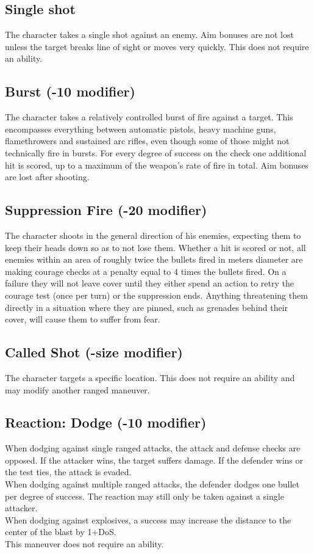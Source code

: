 \documentclass[12pt,a4paper,openany]{book}
\begin{document}
	\subsection*{Single shot}
	The character takes a single shot against an enemy. Aim bonuses are not lost unless the target breaks line of sight or moves very quickly. This does not require an ability.
	\subsection*{Burst (-10 modifier)}
	The character takes a relatively controlled burst of fire against a target. This encompasses everything between automatic pistols, heavy machine guns, flamethrowers and sustained arc rifles, even though some of those might not technically fire in bursts. For every degree of success on the check one additional hit is scored, up to a maximum of the weapon’s rate of fire in total. Aim bonuses are lost after shooting.
	\subsection*{Suppression Fire (-20 modifier)}
	The character shoots in the general direction of his enemies, expecting them to keep their heads down so as to not lose them. Whether a hit is scored or not, all enemies within an area of roughly twice the bullets fired in meters diameter are making courage checks at a penalty equal to 4 times the bullets fired. On a failure they will not leave cover until they either spend an action to retry the courage test (once per turn) or the suppression ends. Anything threatening them directly in a situation where they are pinned, such as grenades behind their cover, will cause them to suffer from fear.
	\subsection*{Called Shot (-size modifier)}
	The character targets a specific location. This does not require an ability and may modify another ranged maneuver.
	\subsection*{Reaction: Dodge (-10 modifier)}
	When dodging against single ranged attacks, the attack and defense checks are opposed. If the attacker wins, the target suffers damage. If the defender wins or the test ties, the attack is evaded.\\
	When dodging against multiple ranged attacks, the defender dodges one bullet per degree of success. The reaction may still only be taken against a single attacker.\\
	When dodging against explosives, a success may increase the distance to the center of the blast by 1+DoS.\\
	This maneuver does not require an ability.
\end{document}
